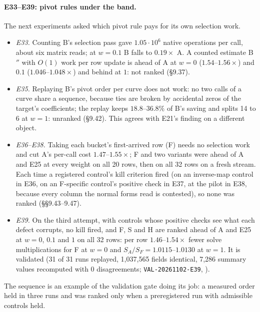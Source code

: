 \paragraph{E33--E39: pivot rules under the band.} The next experiments asked
which pivot rule pays for its own selection work.
\begin{itemize}
\item \emph{E33.} Counting B's selection pass gave $1.05\cdot10^6$ native
  operations per call, about six matrix reads; at $w=0.1$ B falls to $0.19\times$
  A. A counted estimate B$''$ with $O(1)$ work per row update is ahead of A at
  $w=0$ ($1.54$--$1.56\times$) and $0.1$ ($1.046$--$1.048\times$) and behind at $1$:
  not ranked (\S9.37).
\item \emph{E35.} Replaying B's pivot order per curve does not work: no two
  calls of a curve share a sequence, because ties are broken by accidental
  zeros of the target's coefficients; the replay keeps $18.8$--$36.8\%$ of B's
  saving and splits 14 to 6 at $w=1$: unranked (\S9.42). This agrees with E21's
  finding on a different object.
\item \emph{E36--E38.} Taking each bucket's first-arrived row (F) needs no
  selection work and cut A's per-call cost $1.47$--$1.55\times$; F and two
  variants were ahead of A and E25 at every weight on all 20 rows, then on all
  32 rows on a fresh stream. Each time a registered control's kill criterion
  fired (on an inverse-map control in E36, on an F-specific control's positive
  check in E37, at the pilot in E38, because every column the normal forms
  read is contested), so none was ranked (\S\S9.43--9.47).
\item \emph{E39.} On the third attempt, with controls whose positive checks
  see what each defect corrupts, no kill fired, and F, S and H are ranked
  ahead of A and E25 at $w=0$, $0.1$ and $1$ on all 32 rows: per row
  $1.46$--$1.54\times$ fewer solve multiplications for F at $w=0$ and
  $S_A/S_F=1.0115$--$1.0130$ at $w=1$. It is validated (31 of 31 runs replayed,
  1{,}037{,}565 fields identical, 7{,}286 summary values recomputed with 0
  disagreements; \texttt{VAL-20261102-E39},
  ).
\end{itemize}
The sequence is an example of the validation gate doing its job: a measured
order held in three runs and was ranked only when a preregistered run with
admissible controls held.

